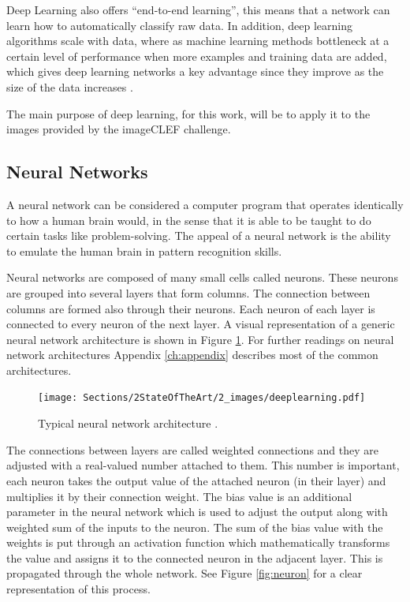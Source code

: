     \par Deep Learning also offers \enquote{end-to-end learning}, this means that a network can learn how to automatically classify raw data. In addition, deep learning algorithms scale with data, where as machine learning methods bottleneck at a certain level of performance when more examples and training data are added, which gives deep learning networks a key advantage since they improve as the size of the data increases \cite{mathworks_deeplearning}.


    The main purpose of deep learning, for this work, will be to apply it to the images provided by the imageCLEF challenge.


\subsection{Neural Networks}
\label{sec:neuralnet}

    \par A neural network can be considered a computer program that operates identically to how a human brain would, in the sense that it is able to be taught to do certain tasks like problem-solving. The appeal of a neural network is the ability to emulate the human brain in pattern recognition skills. 


    \par Neural networks are composed of many small cells called neurons. These neurons are grouped into several layers that form columns. The connection between columns are formed also through their neurons. Each neuron of each layer is connected to every neuron of the next layer. A visual representation of a generic neural network architecture is shown in Figure \ref{fig:neural}. For further readings on neural network architectures Appendix \ref{ch:appendix} describes most of the common architectures.


    \begin{figure}[htb]
        \centering
        \texttt{[image: Sections/2StateOfTheArt/2\_images/deeplearning.pdf]}
        \caption[Typical neural network architecture.]{Typical neural network architecture \cite{mathworks_NN}.}
        \label{fig:neural}
    \end{figure}
        
    
    \par The connections between layers are called weighted connections and they are adjusted with a real-valued number attached to them. This number is important, each neuron takes the output value of the attached neuron (in their layer) and multiplies it by their connection weight. The bias value is an additional parameter in the neural network which is used to adjust the output along with weighted sum of the inputs to the neuron. The sum of the bias value with the weights  is put through an activation function which mathematically transforms the value and assigns it to the connected neuron in the adjacent layer. This is propagated through the whole network.  See Figure \ref{fig:neuron} for a clear representation of this process.
    

